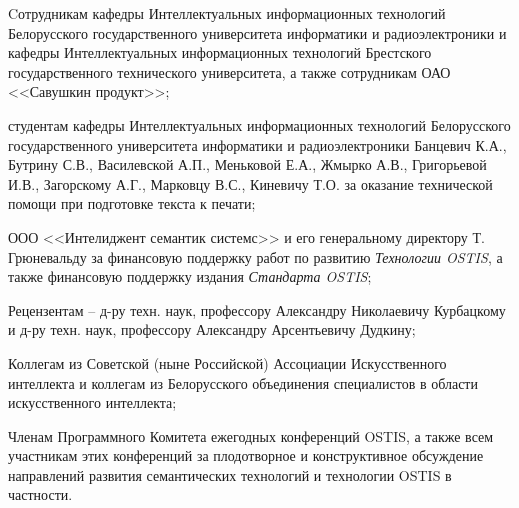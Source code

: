 \begin{SCn}
{\begin{scnitemize}
	\item Cотрудникам кафедры Интеллектуальных информационных технологий Белорусского государственного университета информатики и радиоэлектроники и кафедры Интеллектуальных информационных технологий Брестского государственного технического университета, а также сотрудникам ОАО <<Савушкин продукт>>;
	\item студентам кафедры Интеллектуальных информационных технологий Белорусского государственного университета информатики и радиоэлектроники Банцевич К.А., Бутрину С.В., Василевской А.П., Меньковой Е.А., Жмырко А.В., Григорьевой И.В., Загорскому А.Г., Марковцу В.С., Киневичу Т.О. за оказание технической помощи при подготовке текста к печати;
	\item ООО <<Интелиджент семантик системс>> и его генеральному директору Т. Грюневальду за финансовую поддержку работ по развитию \textit{Технологии OSTIS}, а также финансовую поддержку издания \textit{Стандарта OSTIS};
	\item Рецензентам -- д-ру техн. наук, профессору Александру Николаевичу Курбацкому и д-ру техн. наук, профессору Александру Арсентьевичу Дудкину;
	\item Коллегам из Советской (ныне Российской) Ассоциации Искусственного интеллекта и коллегам из Белорусского объединения специалистов в области искусственного интеллекта;
	\item Членам Программного Комитета ежегодных конференций OSTIS, а также всем участникам этих конференций за плодотворное и конструктивное обсуждение направлений развития семантических технологий и технологии OSTIS в частности.
\end{scnitemize}}

\newpage

\end{SCn}